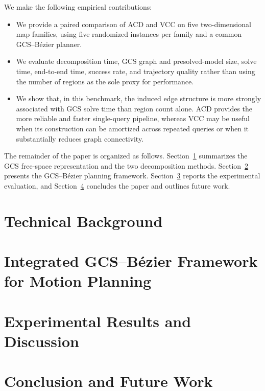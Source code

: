 ﻿\documentclass[runningheads]{llncs}
\begin{document}
We make the following empirical contributions:
\begin{itemize}
  \item We provide a paired comparison of ACD and VCC on five two-dimensional
  map families, using five randomized instances per family and a common
  GCS--B\'ezier planner.
  \item We evaluate decomposition time, GCS graph and presolved-model size,
  solve time, end-to-end time, success rate, and trajectory quality rather than
  using the number of regions as the sole proxy for performance.
  \item We show that, in this benchmark, the induced edge structure is more
  strongly associated with GCS solve time than region count alone. ACD provides
  the more reliable and faster single-query pipeline, whereas VCC may be useful
  when its construction can be amortized across repeated queries or when it
  substantially reduces graph connectivity.
\end{itemize}

The remainder of the paper is organized as follows.
Section~\ref{sec:technical-background} summarizes the GCS free-space
representation and the two decomposition methods.
Section~\ref{sec:gcs-bezier-framework} presents the GCS--B\'ezier planning
framework. Section~\ref{sec:experiments} reports the experimental evaluation,
and Section~\ref{sec:conclusion} concludes the paper and outlines future work.

%
\section{Technical Background}
\label{sec:technical-background}

%

%
\section{Integrated GCS--B\'ezier Framework for Motion Planning}
\label{sec:gcs-bezier-framework}


%
%
\section{Experimental Results and Discussion}
\label{sec:experiments}


%
%
\clearpage
\section{Conclusion and Future Work}
\label{sec:conclusion}
\end{document}
